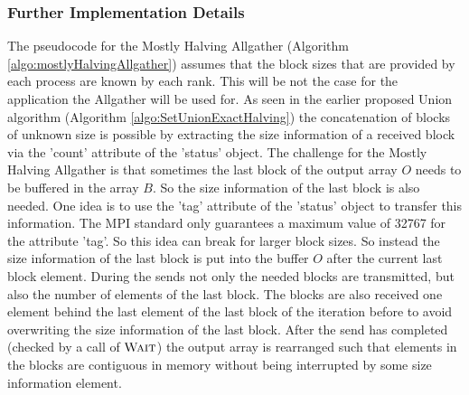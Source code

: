 \subsubsection{Further Implementation Details} \label{sec:reorderingMostlyHalvingAllgather}
The pseudocode for the Mostly Halving Allgather (Algorithm \ref{algo:mostlyHalvingAllgather}) assumes that the block sizes that are provided by each process are known by each rank. This will be not the case for the application the Allgather will be used for. As seen in the earlier proposed Union algorithm (Algorithm \ref{algo:SetUnionExactHalving}) the concatenation of blocks of unknown size is possible by extracting the size information of a received block via the 'count' attribute of the 'status' object. The challenge for the Mostly Halving Allgather is that sometimes the last block of the output array $O$ needs to be buffered in the array $B$. So the size information of the last block is also needed. One idea is to use the 'tag' attribute of the 'status' object to transfer this information. The MPI standard \cite{mpi} only guarantees a maximum value of 32767 for the attribute 'tag'. So this idea can break for larger block sizes. So instead the size information of the last block is put into the buffer $O$ after the current last block element. During the sends not only the needed blocks are transmitted, but also the number of elements of the last block. The blocks are also received one element behind the last element of the last block of the iteration before to avoid overwriting the size information of the last block. After the send has completed (checked by a call of $\Call{Wait}{}$) the output array is rearranged such that elements in the blocks are contiguous in memory without being interrupted by some size information element.

